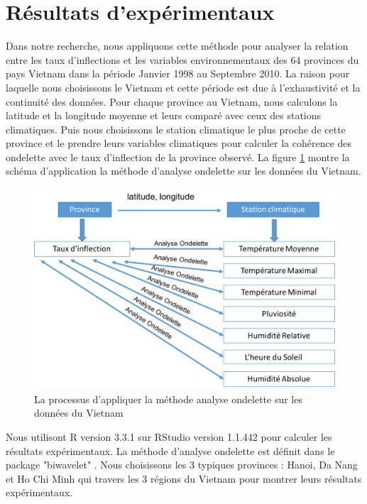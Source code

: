 \section{Résultats d'expérimentaux}

Dans notre recherche, nous appliquons cette méthode pour analyser la relation entre les taux d'inflections et les variables environnementaux des 64 provinces du pays Vietnam dans la période Janvier 1998 au Septembre 2010. La raison pour laquelle nous choisissons le Vietnam et cette période est due à l'exhaustivité  et la continuité des données. Pour chaque province au Vietnam, nous calculons la latitude et la longitude moyenne et leurs comparé avec ceux des stations climatiques. Puis nous choisissons le station climatique le plus proche de cette province et le prendre leurs variables climatiques pour calculer la cohérence des ondelette avec le taux d'inflection de la province observé. La figure \ref{Pic4_2} montre la schéma d'application la méthode d'analyse ondelette sur les données du Vietnam. 

\begin{figure}[h]
\includegraphics[width = \linewidth]{../figures/chap4/Pic4_2.png}
\caption{La processus d'appliquer la méthode analyse ondelette sur les données du Vietnam}
\label{Pic4_2}	
\end{figure}

Nous utilisont R version 3.3.1 sur RStudio version 1.1.442 pour calculer les résultats expérimentaux. La méthode d'analyse ondelette est définit dans le package "biwavelet" \cite{gouhier2018}. Nous choisissons les 3 typiques provinces : Hanoi, Da Nang et Ho Chi Minh qui travers les 3 régions du Vietnam pour montrer leurs résultats expérimentaux. 

